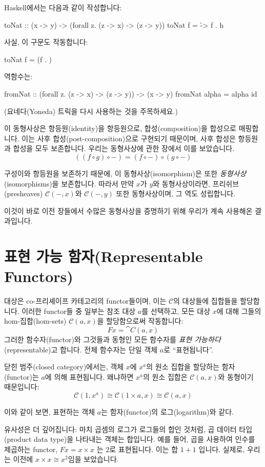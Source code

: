 \documentclass[DaoFP]{subfiles}
\begin{document}
Haskell에서는 다음과 같이 작성합니다:
\begin{haskell}
toNat :: (x -> y) -> (forall z. (z -> x) -> (z -> y))
toNat f = \h -> f . h 
\end{haskell}
사실, 이 구문도 작동합니다:
\begin{haskell}
toNat f = (f . )
\end{haskell}
역함수는:
\begin{haskell}
fromNat :: (forall z. (z -> x) -> (z -> y)) -> (x -> y)
fromNat alpha = alpha id
\end{haskell}
(요네다(Yoneda) 트릭을 다시 사용하는 것을 주목하세요.)

이 동형사상은 항등원(identity)을 항등원으로, 합성(composition)을 합성으로 매핑합니다. 이는 사후 합성(post-composition)으로 구현되기 때문이며, 사후 합성은 항등원과 합성을 모두 보존합니다. 우리는 동형사상에 관한 장에서 이를 보았습니다.
\[ ((f \circ g) \circ -) = (f \circ -) \circ (g \circ -) \]

구성이와 항등원을 보존하기 때문에, 이 동형사상(isomorphism)은 또한 \emph{동형사상}(isomorphisms)을 보존합니다. 따라서 만약 $x$가 $y$와 동형사상이라면, 프리쉬브(presheaves) $ \mathcal{C}(-, x)$와 $ \mathcal{C}(-, y)$ 또한 동형사상이며, 그 역도 성립합니다.

이것이 바로 이전 장들에서 수많은 동형사상을 증명하기 위해 우리가 계속 사용해온 결과입니다.

\section{표현 가능 함자(Representable Functors)}

대상은 co-프리셰이프 카테고리의 functor들이며, 이는 $\mathcal{C}$의 대상들에 집합들을 할당합니다. 이러한 functor들 중 일부는 참조 대상 $a$를 선택하고, 모든 대상 $x$에 대해 그들의 hom-집합(hom-sets) $\mathcal{C}(a, x)$을 할당함으로써 작동합니다:
\[ F x = \cat C(a, x) \]
그러한 함수자(functor)와 그것들과 동형인 모든 함수자를 \emph{표현 가능하다}(representable)고 합니다. 전체 함수자는 단일 객체 $a$로 ``표현됩니다''.

닫힌 범주(closed category)에서는, 객체 $x$에 $x^a$의 원소 집합을 할당하는 함자(functor)는 $a$에 의해 표현됩니다. 왜냐하면 $x^a$의 원소 집합은 $\mathcal{C}(a, x)$와 동형이기 때문입니다:
\[\mathcal{C}(1, x^a) \cong \mathcal{C}(1 \times a, x) \cong \mathcal{C} (a, x)\]

이와 같이 보면, 표현하는 객체 $a$는 함자(functor)의 로그(logarithm)와 같다.

유사성은 더 깊어집니다: 마치 곱셈의 로그가 로그들의 합인 것처럼, 곱 데이터 타입(product data type)을 나타내는 객체는 합입니다. 예를 들어, 곱을 사용하여 인수를 제곱하는 functor, $F x = x \times x$ 는 $2$로 표현됩니다. 이는 합 $1 + 1$ 입니다. 실제로, 우리는 이전에 $x \times x \cong x^2$임을 보았습니다.
\end{document}

